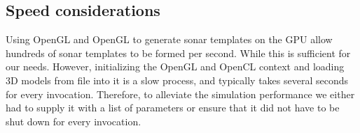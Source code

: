 
\subsection{Speed considerations}

Using OpenGL and OpenGL to generate sonar templates on the GPU allow hundreds of sonar templates to be formed per second. While this is sufficient for our needs. However, initializing the OpenGL and OpenCL context and loading 3D models from file into it is a slow process, and typically takes several seconds for every invocation. Therefore, to alleviate the simulation performance we either had to supply it with a list of parameters or ensure that it did not have to be shut down for every invocation. 



